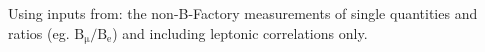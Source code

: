 \noindent Using inputs from: the non-B-Factory measurements of single quantities and ratios (eg. $\mathrm{B_\mu/B_e}$) and including leptonic correlations only.
